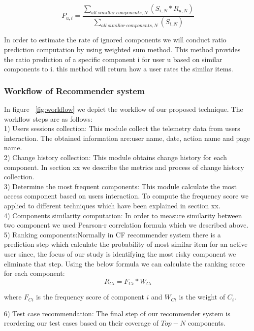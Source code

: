 \[
{P_{u,i} = \frac {\sum_{{all\: simillar\: components , N}}(S_{i,N} * R_{u,N})}
	{\sum_{{all\: simillar\: components, N}}({S_{i,N}})}}
\]

In order to estimate the rate of ignored components we will conduct 
ratio prediction computation by using weighted sum method. 
This method provides the ratio prediction of a specific component i 
for user u based on similar components to i. 
this method will return how a user rates the similar items. 


\subsubsection{Workflow of Recommender system}

In figure ~\ref{fig:workflow} we depict the workflow of our proposed technique. 
The workflow steps are as follows:\\
1) Users sessions collection: This module collect the telemetry data 
from users interaction. The obtained information are:user name, 
date, action name and page name. \\
2) Change history collection: This module obtains change history 
for each component. In section xx we describe the metrics and process 
of change history collection. \\
3) Determine the most frequent components: This module calculate the most 
access component based on users interaction. To compute the frequency score we 
applied to different techniques which have been explained in section xx.\\
4) Components similarity computation: In order to measure similarity between two 
component we used Pearson-r correlation formula which we described above.\\
5) Ranking components:Normally in CF recommender system there is a prediction step 
which calculate the probability of most similar item for an active user since, 
the focus of our study is identifying the most risky component we eliminate that step. 
Using the below formula we can calculate the ranking score for each component: 
\[
{ R_{Ci} = F_{Ci} * W_{Ci}}	
\]

where $F_{Ci}$ is the frequency score of component $i$ and $W_{Ci}$ is the weight of $C_i$.  

6) Test case recommendation: The final step of our recommender system is reordering
our test cases based on their coverage of $Top-N$ components. 

